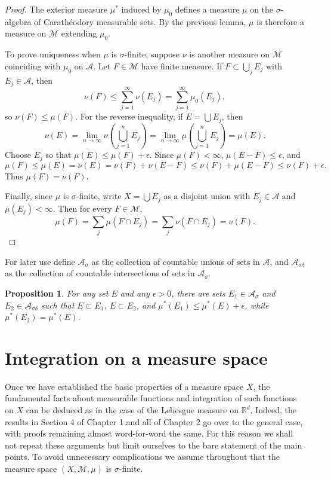 \documentclass[11pt,openany]{book}
\newtheorem{proposition}[theorem]{Proposition}
\begin{document}
\begin{proof}
The exterior measure $\mu^*$ induced by $\mu_0$ defines a measure $\mu$ on the $\sigma$-algebra of Carath\'eodory measurable sets. By the previous lemma, $\mu$ is therefore a measure on $\mathcal M$ extending $\mu_0$.

To prove uniqueness when $\mu$ is $\sigma$-finite, suppose $\nu$ is another measure on $\mathcal M$ coinciding with $\mu_0$ on $\mathcal A$. Let $F\in\mathcal M$ have finite measure. If $F\subset\bigcup_jE_j$ with $E_j\in\mathcal A$, then
\[
\nu(F)\leq\sum_{j=1}^{\infty}\nu(E_j)=\sum_{j=1}^{\infty}\mu_0(E_j),
\]
so $\nu(F)\leq\mu(F)$. For the reverse inequality, if $E=\bigcup E_j$, then
\[
\nu(E)=\lim_{n\to\infty}\nu\left(\bigcup_{j=1}^nE_j\right)
=\lim_{n\to\infty}\mu\left(\bigcup_{j=1}^nE_j\right)=\mu(E).
\]
Choose $E_j$ so that $\mu(E)\leq\mu(F)+\epsilon$. Since $\mu(F)<\infty$, $\mu(E-F)\leq\epsilon$, and
\[
\mu(F)\leq\mu(E)=\nu(E)=\nu(F)+\nu(E-F)
\leq\nu(F)+\mu(E-F)\leq\nu(F)+\epsilon.
\]
Thus $\mu(F)=\nu(F)$.

Finally, since $\mu$ is $\sigma$-finite, write $X=\bigcup E_j$ as a disjoint union with $E_j\in\mathcal A$ and $\mu(E_j)<\infty$. Then for every $F\in\mathcal M$,
\[
\mu(F)=\sum_j\mu(F\cap E_j)=\sum_j\nu(F\cap E_j)=\nu(F).
\]
\end{proof}

For later use define $\mathcal A_{\sigma}$ as the collection of countable unions of sets in $\mathcal A$, and $\mathcal A_{\sigma\delta}$ as the collection of countable intersections of sets in $\mathcal A_{\sigma}$.

\begin{proposition}
For any set $E$ and any $\epsilon>0$, there are sets $E_1\in\mathcal A_{\sigma}$ and $E_2\in\mathcal A_{\sigma\delta}$ such that $E\subset E_1$, $E\subset E_2$, and $\mu^*(E_1)\leq\mu^*(E)+\epsilon$, while $\mu^*(E_2)=\mu^*(E)$.
\end{proposition}

\section{Integration on a measure space}

Once we have established the basic properties of a measure space $X$, the fundamental facts about measurable functions and integration of such functions on $X$ can be deduced as in the case of the Lebesgue measure on $\mathbb R^d$. Indeed, the results in Section 4 of Chapter 1 and all of Chapter 2 go over to the general case, with proofs remaining almost word-for-word the same. For this reason we shall not repeat these arguments but limit ourselves to the bare statement of the main points. To avoid unnecessary complications we assume throughout that the measure space $(X,\mathcal M,\mu)$ is $\sigma$-finite.
\end{document}
